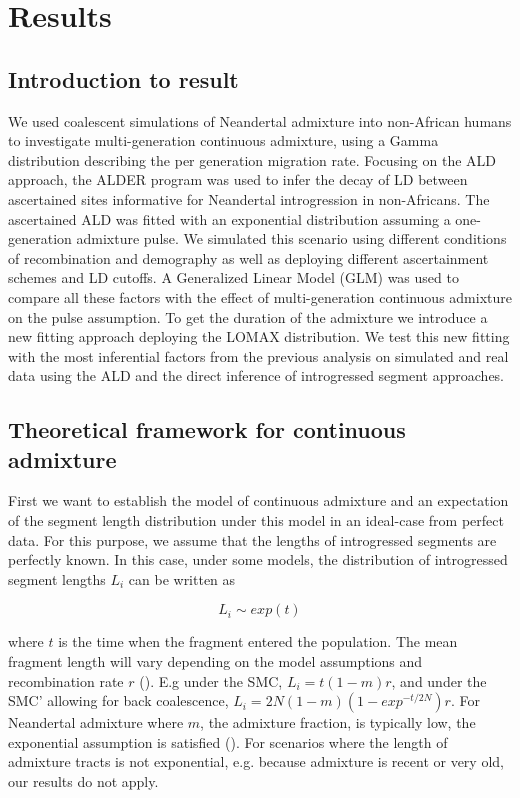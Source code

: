 \documentclass[]{article}
\begin{document}
\section{Results}\label{results}

\subsection{Introduction to result}\label{introduction to result}

We used coalescent simulations of Neandertal admixture into non-African humans to investigate multi-generation continuous admixture, using a Gamma distribution describing the per generation migration rate. Focusing on the ALD approach, the ALDER program was used to infer the decay of LD between ascertained sites informative for Neandertal introgression in non-Africans. The ascertained ALD was fitted with an exponential distribution assuming a one-generation admixture pulse.  We simulated this scenario using different conditions of recombination and demography as well as deploying different ascertainment schemes and LD cutoffs. A Generalized Linear Model (GLM) was used to compare all these factors with the effect of multi-generation continuous admixture on the pulse assumption. To get the duration of the admixture we introduce a new fitting approach deploying the LOMAX distribution. We test this new fitting with the most inferential factors from the previous analysis on simulated and real data using the ALD and the direct inference of introgressed segment approaches.

\subsection{Theoretical framework for continuous admixture}\label{theoretical framework for continuous admixture}

First we want to establish the model of continuous admixture and an
expectation of the segment length distribution under this model in an
ideal-case from perfect data. For this purpose, we assume that the
lengths of introgressed segments are perfectly known. In this case, under
some models, the distribution of introgressed segment lengths \(L_i\) can
be written as

\begin{equation}
L_i \sim exp(t)
\end{equation}

where $t$ is the time when the fragment entered the population. The mean fragment length will vary  depending on the model assumptions and
recombination rate \(r\) (\citep{liang_lengths_2014}). E.g under the SMC,
\(L_i = t(1-m)r\), and under the SMC' allowing for back coalescence,
\(L_i = 2N(1-m)(1-exp^{-t/2N})r\). For Neandertal admixture where
\(m\), the admixture fraction, is typically low, the exponential
assumption is satisfied (\cite{liang_lengths_2014}). For scenarios where
the length of admixture tracts is not exponential, e.g. because
admixture is recent or very old, our results do not apply.
\end{document}
